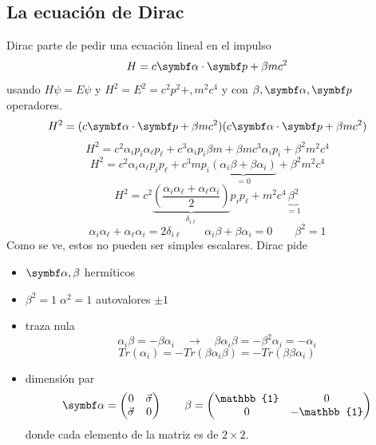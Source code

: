 \documentclass[10pt,oneside]{CBFT_book}
\begin{document}
\subsection{La ecuación de Dirac}

Dirac parte de pedir una ecuación lineal en el impulso 
\[
	H = c \vb{\alpha} \cdot \vb{p} + \beta m c^2
\]
usando $H\psi = E\psi$ y $H^2 = E^2 = c^2p^2 + ,m^2 c^4$ y con $\beta,\vb{\alpha},\vb{p}$ operadores.
\[
	H^2 = (c \vb{\alpha} \cdot \vb{p} + \beta m c^2)(c \vb{\alpha} \cdot \vb{p} + \beta m c^2)
\]
\[
	H^2 = c^2 \alpha_i p_i \alpha_\ell p_\ell + c^3 \alpha_i p_i \beta m +
	\beta m c^3 \alpha_i p_i + \beta^2 m^2 c^4
\]
\[
	H^2 = c^2 \alpha_i \alpha_\ell p_i  p_\ell + c^3 m p_i \underbrace{( \alpha_i \beta + \beta \alpha_i )}_{=0}
	+ \beta^2 m^2 c^4
\]
\[
	H^2 = 
	c^2 \underbrace{\left( \frac{\alpha_i \alpha_\ell + \alpha_\ell\alpha_i}{2} \right)}_{\delta_{i\ell}}
	p_i p_\ell + m^2 c^4 \underbrace{\beta^2 }_{ = 1 }
\]
\[
	\alpha_i \alpha_\ell + \alpha_\ell\alpha_i = 2 \delta_{i\ell} \qquad 
	\alpha_i \beta + \beta \alpha_i= 0 \qquad
	\beta^2 = 1
\]
Como se ve, estos no pueden ser simples escalares. Dirac pide 
\begin{itemize}
 \item $\vb{\alpha},\beta$ hermíticos
 \item $\beta^2=1 \; \alpha^2=1$ autovalores $\pm 1$
 \item traza nula
 \[
	\alpha_i \beta = -\beta \alpha_i  \quad \rightarrow  \quad 
	\beta \alpha_i \beta = -\beta^2 \alpha_i = -\alpha_i
 \]
 \[
	Tr(\alpha_i) = -Tr(\beta \alpha_i \beta) = -Tr(\beta\beta\alpha_i)
 \]
 \item dimensión par 
 \[
	\vb{\alpha} = \begin{pmatrix} 0 & \vec{\sigma} \\ \vec{\sigma} & 0 \\ \end{pmatrix} \qquad 
	\beta = \begin{pmatrix} \mathbb{1} & 0 \\ 0 & -\mathbb{1} \\ \end{pmatrix}
 \]
 donde cada elemento de la matriz es de $2\times2$.
\end{itemize}
\end{document}
